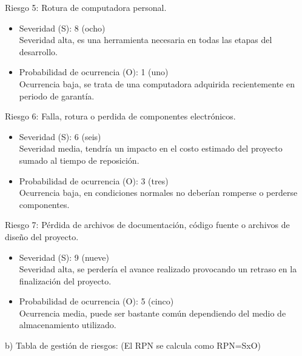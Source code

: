 \documentclass[11pt]{charter}
\begin{document}
Riesgo 5: Rotura de computadora personal.
\begin{itemize}
\item Severidad (S): 8 (ocho) \\
Severidad alta, es una herramienta necesaria en todas las etapas del desarrollo.
\item Probabilidad de ocurrencia (O): 1 (uno) \\
Ocurrencia baja, se trata de una computadora adquirida recientemente en periodo de garantía.
\end{itemize}

Riesgo 6: Falla, rotura o perdida de componentes electrónicos.
\begin{itemize}
\item Severidad (S): 6 (seis) \\
Severidad media, tendría un impacto en el costo estimado del proyecto sumado al tiempo de reposición.
\item Probabilidad de ocurrencia (O): 3 (tres) \\
Ocurrencia baja, en condiciones normales no deberían romperse o perderse componentes.
\end{itemize}

Riesgo 7: Pérdida de archivos de documentación, código fuente o archivos de diseño del proyecto.
\begin{itemize}
\item Severidad (S): 9 (nueve) \\
Severidad alta, se perdería el avance realizado provocando un retraso en la finalización del proyecto.
\item Probabilidad de ocurrencia (O): 5 (cinco) \\
Ocurrencia media, puede ser bastante común dependiendo del medio de almacenamiento utilizado.
\end{itemize}

\newpage

b) Tabla de gestión de riesgos: \hfill (El RPN se calcula como RPN=SxO)
\end{document}
